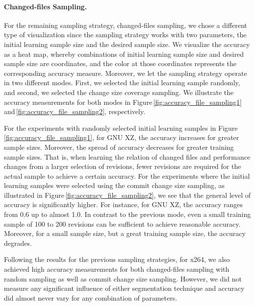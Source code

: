 \paragraph{Changed-files Sampling.} For the remaining sampling strategy,
changed-files sampling, we chose a different type of visualization since the
sampling strategy works with two parameters, the initial learning sample size
and the desired sample size. We visualize the accuracy as a heat map, whereby
combinations of initial learning sample size and desired sample size are
coordinates, and the color at those coordinates represents the corresponding
accuracy measure. Moreover, we let the sampling strategy operate in two
different modes. First, we selected the initial learning sample randomly, and
second, we selected the change size coverage sampling. We illustrate the
accuracy measurements for both modes in
Figure\,\ref{fig:accuracy_file_sampling1}
and\,\ref{fig:accuracy_file_sampling2}, respectively.

For the experiments with randomly selected initial learning samples in
Figure\,\ref{fig:accuracy_file_sampling1},  for GNU XZ, the accuracy increases
for greater sample sizes.
Moreover, the spread of accuracy decreases for greater training sample sizes. That is,
when learning the relation of changed files and performance changes from a
larger selection of revisions, fewer revisions are required for the actual
sample to achieve a certain accuracy. For the experiments where the initial
learning samples were selected using the commit change size sampling, as
illustrated in Figure\,\ref{fig:accuracy_file_sampling2}, we see that the
general level of accuracy is significantly higher. For instance, for GNU XZ, the accuracy ranges from 0.6 up
to almost 1.0. In contrast to the previous mode, even a small training sample
of 100 to 200 revisions can be sufficient to achieve reasonable accuracy.
Moreover, for a small sample size, but a great training sample size, the
accuracy degrades.

Following the results for the previous sampling strategies, for x264, we also
achieved high accuracy measurements for both changed-files sampling with random
sampling as well as commit change size sampling. However, we did not measure
any significant influence of either segmentation technique and accuracy did
almost never vary for any combination of parameters.


